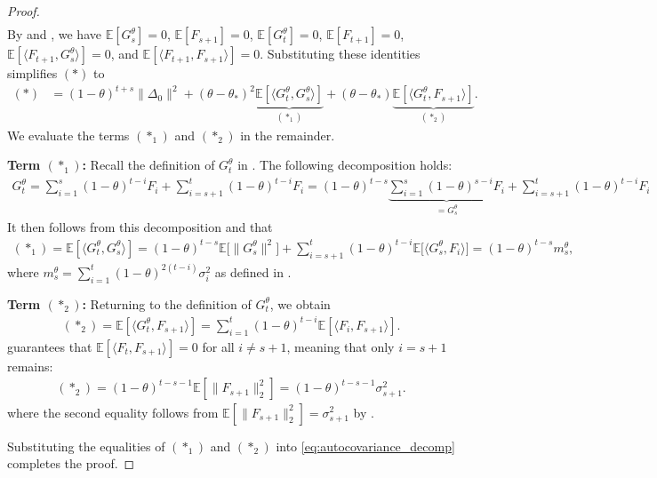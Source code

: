 \documentclass[a4paper, 11pt]{article}
\newcommand{\E}{\mathbb E}
\theoremstyle{definition}
\begin{document}
\begin{proof}
\begin{align}
\end{align}
By  and , we have $\E[ G_s^\theta ] = 0$, $\E[ F_{s+1} ] = 0$, $\E[ G_t^\theta ] = 0$, $\E[ F_{t+1} ] = 0$, $\E[ \langle F_{t+1}, G_s^\theta \rangle ] = 0$, and $\E[ \langle F_{t+1}, F_{s+1} \rangle ] = 0$.
Substituting these identities simplifies $(*)$ to
\begin{align}
    (*) & = (1-\theta)^{t+s}\|\Delta_0\|^2 + (\theta - \theta_*)^2 \underbrace{ \E\left[ \langle G_t^\theta, G_s^\theta \rangle \right] }_{ (*_1) } + (\theta - \theta_*) \underbrace{ \E\left[ \langle G_t^\theta, F_{s+1} \rangle \right] }_{ (*_2) } . \label{eq:autocovariance_decomp}
\end{align}
We evaluate the terms $(*_1)$ and $(*_2)$ in the remainder.

\vspace{5pt}
\noindent
\textbf{Term $(*_1)$:}
Recall the definition of $G_t^\theta$ in .
The following decomposition holds:
\begin{align}
    G_t^\theta = \sum_{i=1}^{s} (1-\theta)^{t-i} F_i + \sum_{i=s+1}^{t} (1-\theta)^{t-i}F_i = (1-\theta)^{t-s} \underbrace{ \sum_{i=1}^s (1-\theta)^{s-i} F_i }_{ = G_s^\theta } + \sum_{i=s+1}^t (1-\theta)^{t-i} F_i
\end{align}
It then follows from this decomposition and  that
\begin{align}
    (*_1) = \E\left[ \langle G_t^\theta, G_s^\theta \rangle \right] = (1 - \theta)^{t-s} \E\big[ \| G_s^\theta \|^2 \big] + \sum_{i=s+1}^t (1 - \theta)^{t-i} \E\big[ \langle G_s^\theta, F_i \rangle \big] = (1-\theta)^{t-s} m_s^\theta ,
\end{align}
where $m_s^\theta = \sum_{i=1}^{t} (1 - \theta)^{2(t-i)} \sigma_i^2$ as defined in .

\vspace{5pt}
\noindent
\textbf{Term $(*_2)$:}
Returning to the definition of $G_t^\theta$, we obtain
\begin{align}
    (*_2) = \E\left[ \langle G_t^\theta, F_{s+1} \rangle \right] = \sum_{i=1}^{t} (1-\theta)^{t-i} \E\left[ \langle F_i, F_{s+1} \rangle \right] .
\end{align}
 guarantees that $\E\left[ \langle F_t, F_{s+1} \rangle \right] = 0$ for all $i \ne s + 1$, meaning that only $i = s + 1$ remains:
\begin{align}
    (*_2) = (1 - \theta)^{t-s-1} \E\left[ \| F_{s+1} \|_2^2 \right] = (1 - \theta)^{t-s-1} \sigma_{s+1}^2 .
\end{align}
where the second equality follows from $\E[ \| F_{s+1} \|_2^2 ] = \sigma_{s+1}^2$ by .

\vspace{5pt}
\noindent
Substituting the equalities of $(*_1)$ and $(*_2)$ into \eqref{eq:autocovariance_decomp} completes the proof.
\end{proof}
\end{document}
